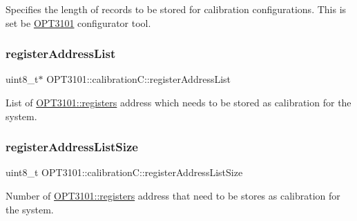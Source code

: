 Specifies the length of records to be stored for calibration configurations. This is set be \mbox{\hyperlink{namespace_o_p_t3101}{O\+P\+T3101}} configurator tool. 

\mbox{\label{class_o_p_t3101_1_1calibration_c_a8ddd81159778cc987557c9b4920d5b57}} 
\subsubsection{\texorpdfstring{register\+Address\+List}{registerAddressList}}
{\footnotesize\ttfamily uint8\+\_\+t$\ast$ O\+P\+T3101\+::calibration\+C\+::register\+Address\+List}



List of \mbox{\hyperlink{class_o_p_t3101_1_1registers}{O\+P\+T3101\+::registers}} address which needs to be stored as calibration for the system. 

\mbox{\label{class_o_p_t3101_1_1calibration_c_a5331ffae8b40e63d277b907a6bf84aa3}} 
\subsubsection{\texorpdfstring{register\+Address\+List\+Size}{registerAddressListSize}}
{\footnotesize\ttfamily uint8\+\_\+t O\+P\+T3101\+::calibration\+C\+::register\+Address\+List\+Size}



Number of \mbox{\hyperlink{class_o_p_t3101_1_1registers}{O\+P\+T3101\+::registers}} address that need to be stores as calibration for the system. 



